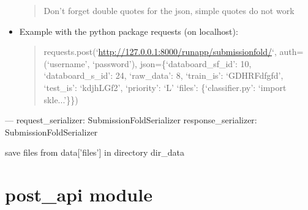 \documentclass[letterpaper,10pt,english]{sphinxmanual}
\begin{document}
\begin{fulllineitems}
\begin{fulllineitems}
\begin{itemize}
\begin{quote}
Don't forget double quotes for the json, simple quotes do not work
\end{quote}

\item {} 
Example with the python package requests (on localhost):
\begin{quote}

requests.post(`\url{http://127.0.0.1:8000/runapp/submissionfold/}`,                          auth=(`username', `password'),                          json=\{`databoard\_sf\_id': 10, `databoard\_s\_id': 24,                                `raw\_data': 8, `train\_is': `GDHRFdfgfd',                                `test\_is': `kdjhLGf2', `priority': `L'                                `files': \{`classifier.py': `import skle...'\}\})
\end{quote}

\end{itemize}

---
request\_serializer: SubmissionFoldSerializer
response\_serializer: SubmissionFoldSerializer

\end{fulllineitems}


\end{fulllineitems}


\begin{fulllineitems}
\label{modules/views:runapp.views.save_files}
save files from data{[}'files'{]} in directory dir\_data

\end{fulllineitems}



\section{post\_api module}
\label{modules/views:module-test_files.post_api}\label{modules/views:post-api-module}
\end{document}
